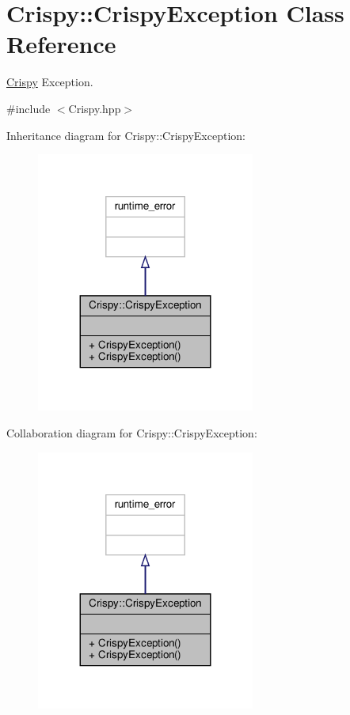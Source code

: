 \hypertarget{class_crispy_1_1_crispy_exception}{}\section{Crispy\+:\+:Crispy\+Exception Class Reference}
\label{class_crispy_1_1_crispy_exception}


\hyperlink{class_crispy}{Crispy} Exception.  




{\ttfamily \#include $<$Crispy.\+hpp$>$}



Inheritance diagram for Crispy\+:\+:Crispy\+Exception\+:
\nopagebreak
\begin{figure}[H]
\begin{center}
\leavevmode
\includegraphics[width=203pt]{class_crispy_1_1_crispy_exception__inherit__graph}
\end{center}
\end{figure}


Collaboration diagram for Crispy\+:\+:Crispy\+Exception\+:
\nopagebreak
\begin{figure}[H]
\begin{center}
\leavevmode
\includegraphics[width=203pt]{class_crispy_1_1_crispy_exception__coll__graph}
\end{center}
\end{figure}

